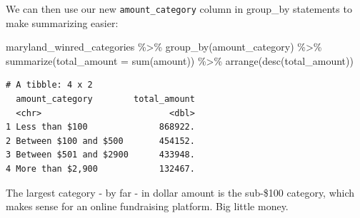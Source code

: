 \documentclass[
  letterpaper,
  DIV=11,
  numbers=noendperiod]{scrreprt}
\newenvironment{Shaded}{\begin{snugshade}}{\end{snugshade}}
\newcommand{\AttributeTok}[1]{\textcolor[rgb]{0.40,0.45,0.13}{#1}}
\newcommand{\DecValTok}[1]{\textcolor[rgb]{0.68,0.00,0.00}{#1}}
\newcommand{\FunctionTok}[1]{\textcolor[rgb]{0.28,0.35,0.67}{#1}}
\newcommand{\NormalTok}[1]{\textcolor[rgb]{0.00,0.23,0.31}{#1}}
\newcommand{\OtherTok}[1]{\textcolor[rgb]{0.00,0.23,0.31}{#1}}
\newcommand{\SpecialCharTok}[1]{\textcolor[rgb]{0.37,0.37,0.37}{#1}}
\newcommand{\StringTok}[1]{\textcolor[rgb]{0.13,0.47,0.30}{#1}}
\begin{document}
\begin{Shaded}
\end{Shaded}

We can then use our new \texttt{amount\_category} column in group\_by
statements to make summarizing easier:

\begin{Shaded}
\begin{Highlighting}[]
\NormalTok{maryland\_winred\_categories }\SpecialCharTok{\%\textgreater{}\%} 
  \FunctionTok{group\_by}\NormalTok{(amount\_category) }\SpecialCharTok{\%\textgreater{}\%} 
  \FunctionTok{summarize}\NormalTok{(}\AttributeTok{total\_amount =} \FunctionTok{sum}\NormalTok{(amount)) }\SpecialCharTok{\%\textgreater{}\%} 
  \FunctionTok{arrange}\NormalTok{(}\FunctionTok{desc}\NormalTok{(total\_amount))}
\end{Highlighting}
\end{Shaded}

\begin{verbatim}
# A tibble: 4 x 2
  amount_category        total_amount
  <chr>                         <dbl>
1 Less than $100              868922.
2 Between $100 and $500       454152.
3 Between $501 and $2900      433948.
4 More than $2,900            132467.
\end{verbatim}

The largest category - by far - in dollar amount is the sub-\$100
category, which makes sense for an online fundraising platform. Big
little money.
\end{document}
